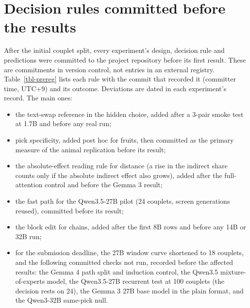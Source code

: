 \documentclass[
]{article}
\providecommand{\tightlist}{%
  \setlength{\itemsep}{0pt}\setlength{\parskip}{0pt}}
\begin{document}
\section{Decision rules committed before the
results}\label{sec-app-prereg}

After the initial couplet split, every experiment's design, decision
rule and predictions were committed to the project repository before its
first result. These are commitments in version control, not entries in
an external registry. Table~\ref{tbl-prereg} lists each rule with the
commit that recorded it (committer time, UTC+9) and its outcome.
Deviations are dated in each experiment's record. The main ones:

\begin{itemize}
\tightlist
\item
  the text-swap reference in the hidden choice, added after a 3-pair
  smoke test at 1.7B and before any real run;
\item
  pick specificity, added post hoc for fruits, then committed as the
  primary measure of the animal replication before its result;
\item
  the absolute-effect reading rule for distance (a rise in the indirect
  share counts only if the absolute indirect effect also grows), added
  after the full-attention control and before the Gemma 3 result;
\item
  the fast path for the Qwen3.5-27B pilot (24 couplets, screen
  generations reused), committed before its result;
\item
  the block edit for chains, added after the first 8B rows and before
  any 14B or 32B run;
\item
  for the submission deadline, the 27B window curve shortened to 18
  couplets, and the following committed checks not run, recorded before
  the affected results: the Gemma 4 path split and induction control,
  the Qwen3.5 mixture-of-experts model, the Qwen3.5-27B recurrent test
  at 100 couplets (the decision rests on 24), the Gemma 3 27B base model
  in the plain format, and the Qwen3-32B same-pick null.
\end{itemize}
\end{document}

